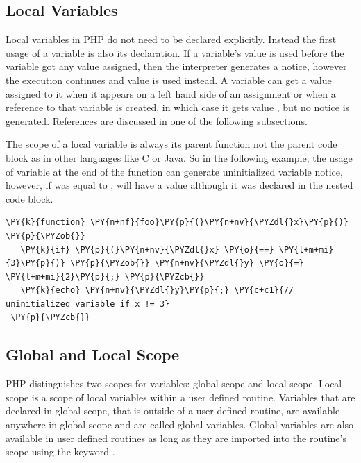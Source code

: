     \subsection{Local Variables}
    Local variables in PHP do not need to be declared explicitly. 
    Instead the first usage of a variable is also its declaration. 
    If a variable's value is used before the variable got any 
    value assigned, then the interpreter generates a notice, 
    however the execution continues and value  is 
    used instead. A variable can get a value assigned to it when it 
    appears on a left hand side of an assignment or when a 
    reference to that variable is created, in which case it gets value 
    , but no notice is generated. References are 
    discussed in one of the following subsections.

    The scope of a local variable is always its parent function not the 
    parent code block as in other languages like C or Java. 
    So in the following 
    example, the usage of variable  at the end 
    of the function can generate uninitialized variable notice, 
    however, if  was equal to , 
     will have a value although it 
    was declared in the nested code block.

\begin{Verbatim}[commandchars=\\\{\}]
 \PY{k}{function} \PY{n+nf}{foo}\PY{p}{(}\PY{n+nv}{\PYZdl{}x}\PY{p}{)} \PY{p}{\PYZob{}}
   \PY{k}{if} \PY{p}{(}\PY{n+nv}{\PYZdl{}x} \PY{o}{==} \PY{l+m+mi}{3}\PY{p}{)} \PY{p}{\PYZob{}} \PY{n+nv}{\PYZdl{}y} \PY{o}{=} \PY{l+m+mi}{2}\PY{p}{;} \PY{p}{\PYZcb{}}
   \PY{k}{echo} \PY{n+nv}{\PYZdl{}y}\PY{p}{;} \PY{c+c1}{// uninitialized variable if x != 3}
 \PY{p}{\PYZcb{}}
\end{Verbatim}
    
    \subsection{Global and Local Scope}
    PHP distinguishes two scopes for variables: global scope and 
    local scope. Local scope is a scope of local variables 
    within a user defined routine.         
    Variables that are declared 
    in global scope, that is outside of a user defined routine, 
    are available anywhere in global scope and are called 
    global variables. Global variables are also available 
    in user defined routines as long as they are imported 
    into the routine's scope using the keyword .
    
